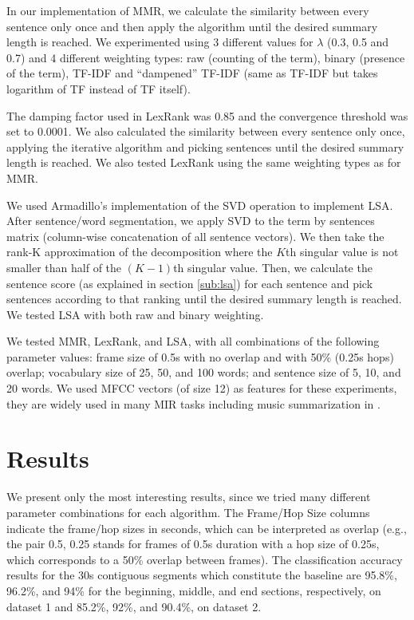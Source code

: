 \documentclass[11pt,onecolumn,draftcls]{IEEEtran}
\begin{document}
In our implementation of \ac{MMR}, we calculate the similarity between every
sentence only once and then apply the algorithm until the desired summary length
is reached. We experimented using 3 different values for $\lambda$ (0.3, 0.5 and
0.7) and 4 different weighting types: raw (counting of the term), binary
(presence of the term), \ac{TF-IDF} and ``dampened'' \ac{TF-IDF} (same as
\ac{TF-IDF} but takes logarithm of TF instead of TF itself).

The damping factor used in LexRank was 0.85 and the convergence threshold
was set to 0.0001. We also calculated the similarity between every sentence only
once, applying the iterative algorithm and picking sentences until the desired
summary length is reached. We also tested LexRank using the same weighting types
as for \ac{MMR}.

We used Armadillo's \cite{armadillo2010} implementation of the \ac{SVD}
operation to implement \ac{LSA}. After sentence/word segmentation, we apply
\ac{SVD} to the term by sentences matrix (column-wise concatenation of all
sentence vectors). We then take the rank-K approximation of the decomposition
where the $K$th singular value is not smaller than half of the
$\left(K-1\right)$th singular value. Then, we calculate the sentence score (as
explained in section \ref{sub:lsa}) for each sentence and pick sentences
according to that ranking until the desired summary length is reached. We tested
\ac{LSA} with both raw and binary weighting.

We tested \ac{MMR}, LexRank, and \ac{LSA}, with all combinations of the
following parameter values: frame size of 0.5s with no overlap and with 50\%
(0.25s hops) overlap; vocabulary size of 25, 50, and 100 words; and sentence
size of 5, 10, and 20 words. We used \ac{MFCC} vectors (of size 12) as features for
these experiments, they are widely used in many MIR tasks including music
summarization in \cite{Cooper2003,Chu2000,Cooper2002,Glaczynski2011}.

\section{Results\label{sec:results}}
We present only the most interesting results, since we tried many different
parameter combinations for each algorithm. The Frame/Hop Size columns
indicate the frame/hop sizes in seconds, which can be interpreted as overlap
(e.g., the pair 0.5, 0.25 stands for frames of 0.5s duration with a hop size of
0.25s, which corresponds to a 50\% overlap between frames). The classification
accuracy results for the 30s contiguous segments which constitute the baseline
are 95.8\%, 96.2\%, and 94\% for the beginning, middle, and end sections,
respectively, on dataset 1 and 85.2\%, 92\%, and 90.4\%, on dataset 2.
\end{document}
